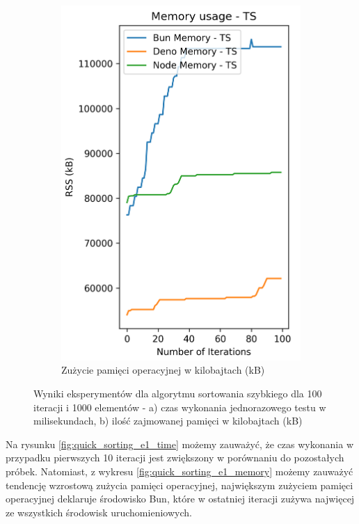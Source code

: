 \begin{figure}[H]
\begin{subfigure}[b]{0.42\textwidth}
  \end{subfigure}
  \begin{subfigure}[b]{0.42\textwidth}
    \centering
    \includegraphics[width=\textwidth]{Figures/sorting/sorting_quick_100_1000_ts_memory.png}
    \caption{Zużycie pamięci operacyjnej w kilobajtach (kB)}
    \label{fig:quick_sorting_e1_ts_memory}
  \end{subfigure}
  \caption{Wyniki eksperymentów dla algorytmu sortowania szybkiego dla 100 iteracji i 1000 elementów - a) czas wykonania jednorazowego testu w milisekundach, b) ilość zajmowanej pamięci w kilobajtach (kB)}
  \label{fig:quick_sorting_e1_ts}
\end{figure}

Na rysunku \ref{fig:quick_sorting_e1_time} możemy zauważyć, że czas wykonania w przypadku pierwszych 10 iteracji jest zwiększony w porównaniu do pozostałych próbek. Natomiast, z wykresu \ref{fig:quick_sorting_e1_memory} możemy zauważyć tendencję wzrostową zużycia pamięci operacyjnej, największym zużyciem pamięci operacyjnej deklaruje środowisko Bun, które w ostatniej iteracji zużywa najwięcej ze wszystkich środowisk uruchomieniowych.


